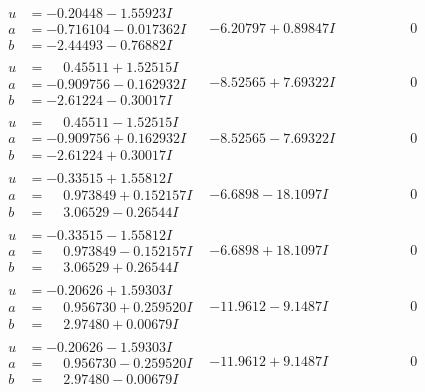 \documentclass[1p]{elsarticle_modified}
\theoremstyle{definition}
\begin{document}
$$\begin{array}{c|c|c}
\begin{aligned}
u &= -0.20448 - 1.55923 I \\
a &= -0.716104 - 0.017362 I \\
b &= -2.44493 - 0.76882 I\end{aligned}
 & -6.20797 + 0.89847 I & \phantom{-0.000000 } 0 \\ \hline\begin{aligned}
u &= \phantom{-}0.45511 + 1.52515 I \\
a &= -0.909756 - 0.162932 I \\
b &= -2.61224 - 0.30017 I\end{aligned}
 & -8.52565 + 7.69322 I & \phantom{-0.000000 } 0 \\ \hline\begin{aligned}
u &= \phantom{-}0.45511 - 1.52515 I \\
a &= -0.909756 + 0.162932 I \\
b &= -2.61224 + 0.30017 I\end{aligned}
 & -8.52565 - 7.69322 I & \phantom{-0.000000 } 0 \\ \hline\begin{aligned}
u &= -0.33515 + 1.55812 I \\
a &= \phantom{-}0.973849 + 0.152157 I \\
b &= \phantom{-}3.06529 - 0.26544 I\end{aligned}
 & -6.6898 - 18.1097 I & \phantom{-0.000000 } 0 \\ \hline\begin{aligned}
u &= -0.33515 - 1.55812 I \\
a &= \phantom{-}0.973849 - 0.152157 I \\
b &= \phantom{-}3.06529 + 0.26544 I\end{aligned}
 & -6.6898 + 18.1097 I & \phantom{-0.000000 } 0 \\ \hline\begin{aligned}
u &= -0.20626 + 1.59303 I \\
a &= \phantom{-}0.956730 + 0.259520 I \\
b &= \phantom{-}2.97480 + 0.00679 I\end{aligned}
 & -11.9612 - 9.1487 I & \phantom{-0.000000 } 0 \\ \hline\begin{aligned}
u &= -0.20626 - 1.59303 I \\
a &= \phantom{-}0.956730 - 0.259520 I \\
b &= \phantom{-}2.97480 - 0.00679 I\end{aligned}
 & -11.9612 + 9.1487 I & \phantom{-0.000000 } 0 \\ \hline\begin{aligned}

\end{aligned}
\end{array}$$
\end{document}
